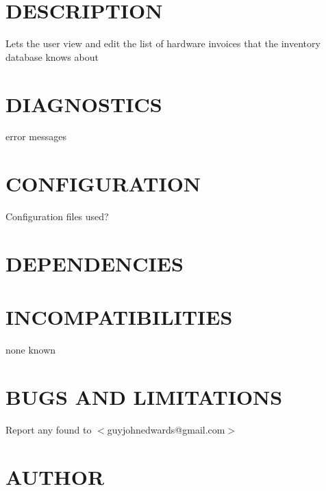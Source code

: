\documentclass{book}
\begin{document}
\section{DESCRIPTION}
\label{_DESCRIPTION}
\hypertarget{_DESCRIPTION}{}



Lets the user view and edit the list of hardware invoices that the inventory database knows about


\section{DIAGNOSTICS}
\label{_DIAGNOSTICS}
\hypertarget{_DIAGNOSTICS}{}



error messages


\section{CONFIGURATION}
\label{_CONFIGURATION}
\hypertarget{_CONFIGURATION}{}



Configuration files used?


\section{DEPENDENCIES}
\label{_DEPENDENCIES}
\hypertarget{_DEPENDENCIES}{}


\section{INCOMPATIBILITIES}
\label{_INCOMPATIBILITIES}
\hypertarget{_INCOMPATIBILITIES}{}



none known


\section{BUGS AND LIMITATIONS}
\label{_BUGS_AND_LIMITATIONS}
\hypertarget{_BUGS_AND_LIMITATIONS}{}



Report any found to $<$guyjohnedwards@gmail.com$>$


\section{AUTHOR}
\label{_AUTHOR}
\hypertarget{_AUTHOR}{}
\end{document}
